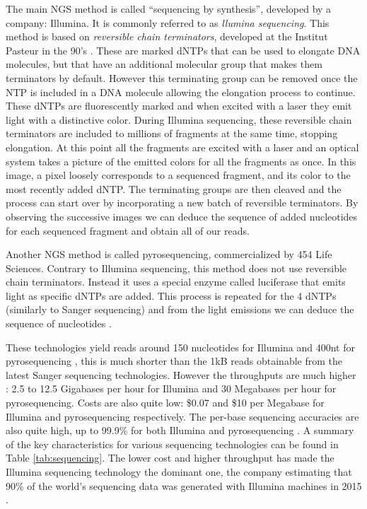 \documentclass[
  11pt,
  twoside]{scrbook}
\begin{document}
The main NGS method is called ``sequencing by synthesis'', developed by a company: Illumina. It is commonly referred to as \emph{llumina sequencing}. This method is based on \emph{reversible chain terminators}, developed at the Institut Pasteur in the 90's \autocite{canardDNAPolymeraseFluorescent1994}. These are marked dNTPs that can be used to elongate DNA molecules, but that have an additional molecular group that makes them terminators by default. However this terminating group can be removed once the NTP is included in a DNA molecule allowing the elongation process to continue. These dNTPs are fluorescently marked and when excited with a laser they emit light with a distinctive color. During Illumina sequencing, these reversible chain terminators are included to millions of fragments at the same time, stopping elongation. At this point all the fragments are excited with a laser and an optical system takes a picture of the emitted colors for all the fragments as once. In this image, a pixel loosely corresponds to a sequenced fragment, and its color to the most recently added dNTP. The terminating groups are then cleaved and the process can start over by incorporating a new batch of reversible terminators. By observing the successive images we can deduce the sequence of added nucleotides for each sequenced fragment and obtain all of our reads.

Another NGS method is called pyrosequencing, commercialized by 454 Life Sciences. Contrary to Illumina sequencing, this method does not use reversible chain terminators. Instead it uses a special enzyme called luciferase that emits light as specific dNTPs are added. This process is repeated for the 4 dNTPs (similarly to Sanger sequencing) and from the light emissions we can deduce the sequence of nucleotides \autocite{nyrenSolidPhaseDNA1993}.

These technologies yield reads around 150 nucleotides for Illumina and 400nt for pyrosequencing \autocite{mardisDecadePerspectiveDNA2011}, this is much shorter than the 1kB reads obtainable from the latest Sanger sequencing technologies. However the throughputs are much higher \autocite{liuComparisonNextGenerationSequencing2012}: 2.5 to 12.5 Gigabases per hour for Illumina and 30 Megabases per hour for pyrosequencing. Costs are also quite low: \$0.07 and \$10 per Megabase for Illumina and pyrosequencing respectively. The per-base sequencing accuracies are also quite high, up to 99.9\% for both Illumina \autocite{stolerSequencingErrorProfiles2021} and pyrosequencing \autocite{liuComparisonNextGenerationSequencing2012}. A summary of the key characteristics for various sequencing technologies can be found in Table \ref{tab:sequencing}. The lower cost and higher throughput has made the Illumina sequencing technology the dominant one, the company estimating that 90\% of the world's sequencing data was generated with Illumina machines in 2015 \autocite{SequencingTechnologySequencing}.
\end{document}
